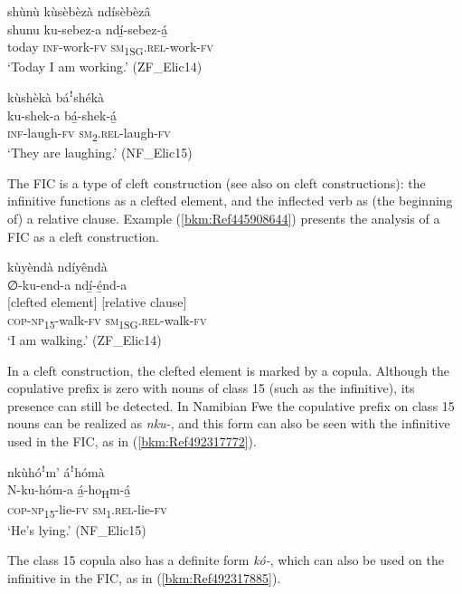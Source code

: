 \ea
\label{bkm:Ref71280638}
shùnù kùsèbèzà ndísèbèzâ\\
\gll shunu  ku-sebez-a  ndí̲-sebez-á̲\\
today  \textsc{inf}-work-\textsc{fv}  \textsc{sm}\textsubscript{1SG}.\textsc{rel}-work-\textsc{fv}\\
\glt ‘Today I am working.’ (ZF\_Elic14)
\z

\ea
\label{bkm:Ref71280639}
kùshèkà báꜝshékà\\
\gll ku-shek-a    bá̲-shek-á̲\\
\textsc{inf}-laugh-\textsc{fv}  \textsc{sm}\textsubscript{2}.\textsc{rel}-laugh-\textsc{fv}\\
\glt ‘They are laughing.’ (NF\_Elic15)
\z

The FIC is a type of cleft construction (see also  on cleft constructions): the infinitive functions as a clefted element, and the inflected verb as (the beginning of) a relative clause. Example (\ref{bkm:Ref445908644}) presents the analysis of a FIC as a cleft construction.

\ea
\label{bkm:Ref445908644}
kùyèndà ndíyêndà\\
\glll ∅-ku-end-a    ndí̲-é̲nd-a\\
{[clefted element]}  {[relative clause]}\\
\textsc{cop}-\textsc{np}\textsubscript{15}-walk-\textsc{fv}  \textsc{sm}\textsubscript{1SG}.\textsc{rel}-walk-\textsc{fv}\\
\glt ‘I am walking.’ (ZF\_Elic14)
\z

In a cleft construction, the clefted element is marked by a copula. Although the copulative prefix is zero with nouns of class 15 (such as the infinitive), its presence can still be detected. In Namibian Fwe the copulative prefix on class 15 nouns can be realized as \textit{nku-}, and this form can also be seen with the infinitive used in the FIC, as in (\ref{bkm:Ref492317772}).

\ea
\label{bkm:Ref492317772}
nkùhóꜝm’ áꜝhómà\\
\gll N-ku-hóm-a  á̲-ho\textsubscript{H}m-á̲\\
\textsc{cop}-\textsc{np}\textsubscript{15}-lie-\textsc{fv}  \textsc{sm}\textsubscript{1}.\textsc{rel}-lie-\textsc{fv}\\
\glt ‘He’s lying.’ (NF\_Elic15)
\z

The class 15 copula also has a definite form \textit{kó-}, which can also be used on the infinitive in the FIC, as in (\ref{bkm:Ref492317885}).

